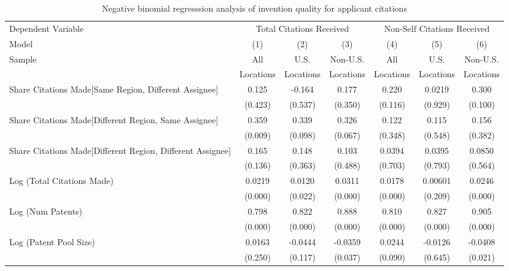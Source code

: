 \begin{sidewaystable}[htbp]\centering \caption{Negative binomial regresssion analysis of invention quality for applicant citations  \label{a.model123192021}} \begin{tabular}{l*{6}{c}} \hline\hline
 Dependent Variable&\multicolumn{3}{c}{Total Citations Received}&\multicolumn{3}{c}{Non-Self Citations Received}\\
                Model&\multicolumn{1}{c}{(1)}&\multicolumn{1}{c}{(2)}&\multicolumn{1}{c}{(3)}&\multicolumn{1}{c}{(4)}&\multicolumn{1}{c}{(5)}&\multicolumn{1}{c}{(6)}\\
                 \hline
 \multirow{2}{*}{Sample}&\multicolumn{1}{c}{All}&\multicolumn{1}{c}{U.S.}&\multicolumn{1}{c}{Non-U.S.}&\multicolumn{1}{c}{All}&\multicolumn{1}{c}{U.S.}&\multicolumn{1}{c}{Non-U.S.}\\       
  &\multicolumn{1}{c}{Locations}&\multicolumn{1}{c}{Locations}&\multicolumn{1}{c}{Locations}&\multicolumn{1}{c}{Locations}&\multicolumn{1}{c}{Locations}&\multicolumn{1}{c}{Locations}\\ \hline
Share Citations Made[Same Region, Different Assignee]&    0.125&   -0.164&    0.177&    0.220&   0.0219&    0.300\\
                &  (0.423)&  (0.537)&  (0.350)&  (0.116)&  (0.929)&  (0.100)\\
Share Citations Made[Different Region, Same Assignee]&    0.359&    0.339&    0.326&    0.122&    0.115&    0.156\\
                &  (0.009)&  (0.098)&  (0.067)&  (0.348)&  (0.548)&  (0.382)\\
Share Citations Made[Different Region, Different Assignee]&    0.165&    0.148&    0.103&   0.0394&   0.0395&   0.0850\\
                &  (0.136)&  (0.363)&  (0.488)&  (0.703)&  (0.793)&  (0.564)\\
Log (Total Citations Made)&   0.0219&   0.0120&   0.0311&   0.0178&  0.00601&   0.0246\\
                &  (0.000)&  (0.022)&  (0.000)&  (0.000)&  (0.209)&  (0.000)\\
Log (Num Patents)&    0.798&    0.822&    0.888&    0.810&    0.827&    0.905\\
                &  (0.000)&  (0.000)&  (0.000)&  (0.000)&  (0.000)&  (0.000)\\
Log (Patent Pool Size)&   0.0163&  -0.0444&  -0.0359&   0.0244&  -0.0126&  -0.0408\\
                &  (0.250)&  (0.117)&  (0.037)&  (0.090)&  (0.645)&  (0.021)\\

\end{tabular}
\end{sidewaystable}
